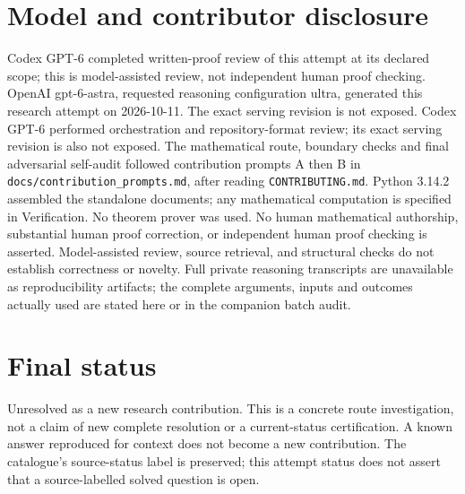 \documentclass[11pt]{article}
\begin{document}
\section{Model and contributor disclosure}
Codex GPT-6 completed written-proof review of this attempt at its declared scope; this is model-assisted review, not independent human proof checking.
OpenAI gpt-6-astra, requested reasoning configuration ultra, generated this research
attempt on 2026-10-11. The exact serving revision is not exposed. Codex GPT-6
performed orchestration and repository-format review; its exact serving revision
is also not exposed. The mathematical route, boundary checks and final adversarial
self-audit followed contribution prompts A then B in
\texttt{docs/contribution\_prompts.md}, after reading \texttt{CONTRIBUTING.md}.
Python 3.14.2 assembled the standalone documents; any mathematical computation is
specified in Verification. No theorem prover was used. No human mathematical
authorship, substantial human proof correction, or independent human proof checking
is asserted. Model-assisted review, source retrieval, and structural checks do not
establish correctness or novelty. Full private reasoning transcripts are unavailable
as reproducibility artifacts; the complete arguments, inputs and outcomes actually
used are stated here or in the companion batch audit.
\section{Final status}
Unresolved as a new research contribution. This is a concrete route investigation,
not a claim of new complete resolution or a current-status certification. A known
answer reproduced for context does not become a new contribution. The catalogue's
source-status label is preserved; this attempt status does not assert that a
source-labelled solved question is open.
\end{document}
